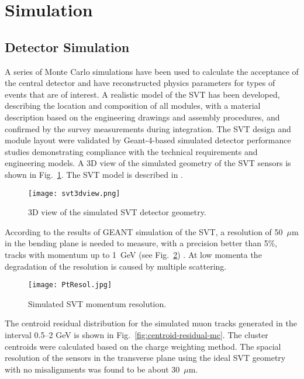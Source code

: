 \section{Simulation}

\subsection{Detector Simulation}

A series of Monte Carlo simulations have been used to calculate the acceptance of the central detector and have reconstructed physics parameters for types of events that are of interest. A realistic model of the SVT has been developed, describing the location and composition of all modules, with a material description based on the engineering drawings and assembly procedures, and confirmed by the survey measurements during integration. The SVT design and module layout were validated by Geant-4-based simulated detector performance studies demonstrating compliance with the technical requirements and engineering models. A 3D view of the simulated geometry of the SVT sensors is shown in Fig.~\ref{fig:svt3dview}. The SVT model is described in \cite{MCNIM}. 

\begin{figure}[hbt] 
\centering 
\texttt{[image: svt3dview.png]}
\caption{3D view of the simulated SVT detector geometry.}
\label{fig:svt3dview}
\end{figure}

According to the results of GEANT simulation of the SVT, a resolution of 50~$\mu$m in the bending plane is needed to measure, with a precision better than 5$\%$, tracks with momentum up to 1~GeV (see Fig.~\ref{fig:PtRes}) \cite{MC1,MC2}. At low momenta the degradation of the resolution is caused by multiple scattering.

\begin{figure}[hbt]
\texttt{[image: PtResol.jpg]}
\caption{Simulated SVT momentum resolution.}
\label{fig:PtRes}
\end{figure}

The centroid residual distribution for the simulated muon tracks generated in the interval 0.5--2 GeV is shown in Fig.~\ref{fig:centroid-residual-mc}. The cluster centroids were calculated based on the charge weighting method. The spacial resolution of the sensors in the transverse plane using the ideal SVT geometry with no misalignments was found to be about 30~$\mu$m. 

